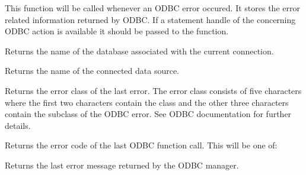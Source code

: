 
This function will be called whenever an ODBC error occured. It stores the
error related information returned by ODBC. If a statement handle of the
concerning ODBC action is available it should be passed to the function.



Returns the name of the database associated with the current connection.



Returns the name of the connected data source.
  


Returns the error class of the last error. The error class consists of
five characters where the first two characters contain the class
and the other three characters contain the subclass of the ODBC error.
See ODBC documentation for further details.



Returns the error code of the last ODBC function call. This will be one of:

\begin{twocollist}\itemsep=0pt
\end{twocollist}


  
Returns the last error message returned by the ODBC manager.



